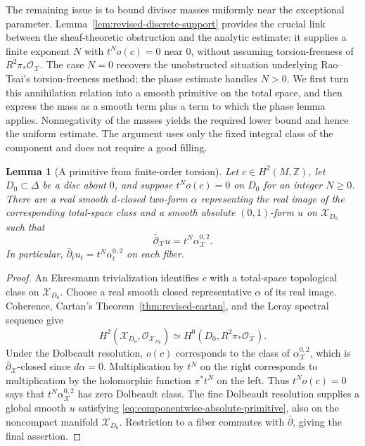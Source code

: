 \documentclass[11pt]{amsart}
\numberwithin{equation}{section}
\theoremstyle{plain}
\newtheorem{lemma}[thm]{Lemma}
\theoremstyle{definition}
\newcommand{\Z}{\mathbb Z}
\newcommand{\cO}{\mathcal O}
\newcommand{\cX}{\mathcal X}
\begin{document}
The remaining issue is to bound divisor masses uniformly near the
exceptional parameter.  Lemma~\ref{lem:revised-discrete-support} provides
the crucial link between the sheaf-theoretic obstruction and the analytic
estimate: it supplies a finite exponent $N$ with $t^No(c)=0$ near $0$,
without assuming torsion-freeness of $R^2\pi_*\cO_{\cX}$.
The case $N=0$ recovers the unobstructed situation underlying
Rao--Tsai's torsion-freeness method; the phase estimate handles $N>0$.
We first turn this annihilation relation into a smooth primitive on the
total space, and then express
the mass as a smooth term plus a term to which the phase lemma applies.
Nonnegativity of the masses yields the required lower bound and hence
the uniform estimate.  The argument uses only the fixed integral class
of the component and does not require a good filling.

\begin{lemma}[A primitive from finite-order torsion]
\label{lem:componentwise-torsion-primitive}
Let $c\in H^2(M,\Z)$, let $D_0\subset\Delta$ be a disc about $0$,
and suppose $t^No(c)=0$ on $D_0$ for an integer $N\ge0$.
There are a real smooth $d$-closed two-form $\alpha$ representing
the real image of the corresponding total-space class and a smooth
absolute $(0,1)$-form $u$ on $\cX_{D_0}$ such that
\begin{equation}\label{eq:componentwise-absolute-primitive}
 \bar\partial_{\cX}u=t^N\alpha^{0,2}_{\cX}.
\end{equation}
In particular, $\bar\partial_tu_t=t^N\alpha_t^{0,2}$ on each fiber.
\end{lemma}

\begin{proof}
An Ehresmann trivialization identifies $c$ with a total-space
topological class on $\cX_{D_0}$.  Choose a real smooth closed
representative $\alpha$ of its real image.  Coherence, Cartan's
Theorem~\ref{thm:revised-cartan}, and the Leray spectral sequence give
\[
 H^2(\cX_{D_0},\cO_{\cX_{D_0}})
 \simeq H^0(D_0,R^2\pi_*\cO_{\cX}).
\]
Under the Dolbeault resolution, $o(c)$ corresponds to the class of
$\alpha^{0,2}_{\cX}$, which is $\bar\partial_{\cX}$-closed since
$d\alpha=0$.  Multiplication by $t^N$ on the right corresponds to
multiplication by the holomorphic function $\pi^*t^N$ on the left.
Thus $t^No(c)=0$ says that $t^N\alpha^{0,2}_{\cX}$ has zero
Dolbeault class.  The fine Dolbeault resolution supplies a global
smooth $u$ satisfying \eqref{eq:componentwise-absolute-primitive},
also on the noncompact manifold $\cX_{D_0}$.  Restriction to a fiber
commutes with $\bar\partial$, giving the final assertion.
\end{proof}
\end{document}

